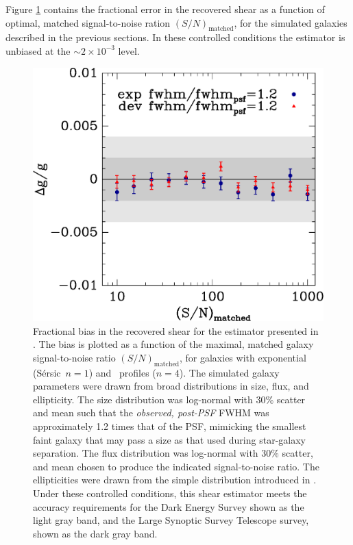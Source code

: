 \documentclass[12pt,preprint]{aastex}
\newcommand{\Msn}{$(S/N)_{\textrm{matched}}$}
\newcommand{\sersic}{S\'{e}rsic}
\newcommand{\lognormscatt}{30}
\begin{document}
Figure \ref{fig:fracerr} contains the fractional error in the recovered shear
as a function of optimal, matched signal-to-noise ration \Msn, for the
simulated galaxies described in the previous sections.  In these controlled
conditions the estimator is unbiased at the $\sim 2\times 10^{-3}$ level.

\begin{figure}[p] \centering
 \centering 
 \includegraphics[scale=0.8]{figures/ngmix-fwhm1.2.eps}

 \caption{ Fractional bias in the recovered shear for the estimator presented
     in \cite{ba14}.  The bias is plotted as a function of the maximal, matched
     galaxy signal-to-noise ratio \Msn, for galaxies with exponential (\sersic\
     $n=1$) and \devauc\ profiles ($n=4$).  The simulated galaxy parameters
     were drawn from broad distributions in size, flux, and ellipticity.  The
     size distribution was log-normal with \lognormscatt\% scatter and mean
     such that the {\it observed, post-PSF} FWHM was approximately 1.2 times
     that of the PSF, mimicking the smallest faint galaxy that may pass a size
     as that used during star-galaxy separation.  The flux distribution was
     log-normal with \lognormscatt\% scatter, and mean chosen to produce the
     indicated signal-to-noise ratio.  The ellipticities were drawn from the
     simple distribution introduced in \cite{ba14}. Under these controlled
     conditions, this shear estimator meets the accuracy requirements for the
 Dark Energy Survey shown as the light gray band, and the Large Synoptic Survey
 Telescope survey, shown as the dark gray band.  \label{fig:fracerr}}

\end{figure}
\end{document}
